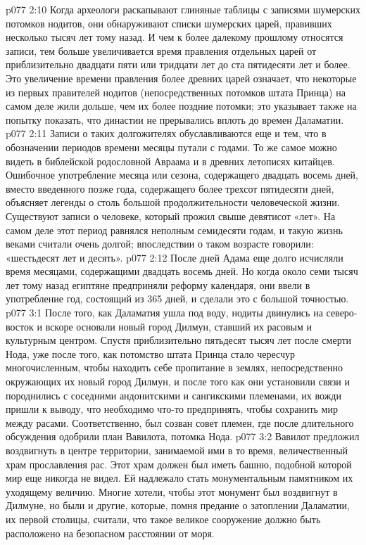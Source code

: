 \vs p077 2:10 Когда археологи раскапывают глиняные таблицы с записями шумерских потомков нодитов, они обнаруживают списки шумерских царей, правивших несколько тысяч лет тому назад. И чем к более далекому прошлому относятся записи, тем больше увеличивается время правления отдельных царей от приблизительно двадцати пяти или тридцати лет до ста пятидесяти лет и более. Это увеличение времени правления более древних царей означает, что некоторые из первых правителей нодитов (непосредственных потомков штата Принца) на самом деле жили дольше, чем их более поздние потомки; это указывает также на попытку показать, что династии не прерывались вплоть до времен Даламатии.
\vs p077 2:11 Записи о таких долгожителях обуславливаются еще и тем, что в обозначении периодов времени месяцы путали с годами. То же самое можно видеть в библейской родословной Авраама и в древних летописях китайцев. Ошибочное употребление месяца или сезона, содержащего двадцать восемь дней, вместо введенного позже года, содержащего более трехсот пятидесяти дней, объясняет легенды о столь большой продолжительности человеческой жизни. Существуют записи о человеке, который прожил свыше девятисот «лет». На самом деле этот период равнялся неполным семидесяти годам, и такую жизнь веками считали очень долгой; впоследствии о таком возрасте говорили: «шестьдесят лет и десять».
\vs p077 2:12 После дней Адама еще долго исчисляли время месяцами, содержащими двадцать восемь дней. Но когда около семи тысяч лет тому назад египтяне предприняли реформу календаря, они ввели в употребление год, состоящий из 365 дней, и сделали это с большой точностью.
\vs p077 3:1 После того, как Даламатия ушла под воду, нодиты двинулись на северо\hyp{}восток и вскоре основали новый город Дилмун, ставший их расовым и культурным центром. Спустя приблизительно пятьдесят тысяч лет после смерти Нода, уже после того, как потомство штата Принца стало чересчур многочисленным, чтобы находить себе пропитание в землях, непосредственно окружающих их новый город Дилмун, и после того как они установили связи и породнились с соседними андонитскими и сангикскими племенами, их вожди пришли к выводу, что необходимо что\hyp{}то предпринять, чтобы сохранить мир между расами. Соответственно, был созван совет племен, где после длительного обсуждения одобрили план Вавилота, потомка Нода.
\vs p077 3:2 Вавилот предложил воздвигнуть в центре территории, занимаемой ими в то время, величественный храм прославления рас. Этот храм должен был иметь башню, подобной которой мир еще никогда не видел. Ей надлежало стать монументальным памятником их уходящему величию. Многие хотели, чтобы этот монумент был воздвигнут в Дилмуне, но были и другие, которые, помня предание о затоплении Даламатии, их первой столицы, считали, что такое великое сооружение должно быть расположено на безопасном расстоянии от моря.
